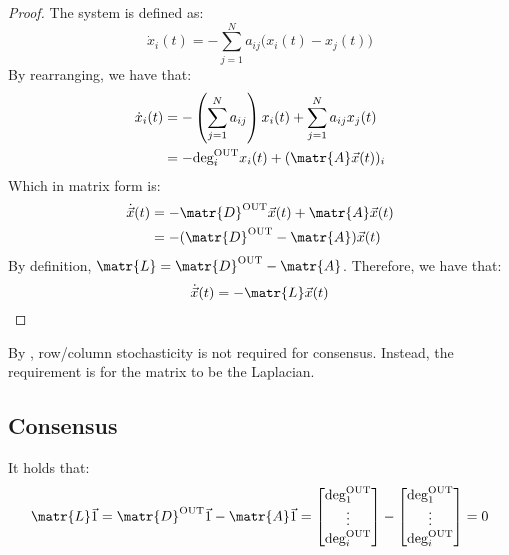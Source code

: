 \begin{description}
\begin{theorem}
            \begin{proof}
                The system is defined as:
                \[
                    \dot{x}_i(t) = - \sum_{j=1}^{N} a_{ij} \Big( x_i(t) - x_j(t) \Big)  
                \]
                By rearranging, we have that:
                \[
                    \begin{split}
                        \dot{x}_i(t) 
                            &= - \left( \sum_{j=1}^{N} a_{ij} \right) x_i(t) + \sum_{j=1}^{N} a_{ij} x_j(t) \\
                            &= -\outdeg[i] x_i(t) + (\matr{A}\vec{x}(t))_i
                    \end{split}
                \]
                Which in matrix form is:
                \[ 
                    \begin{split}
                        \dot{\vec{x}}(t) 
                            &= - \matr{D}^\text{OUT} \vec{x}(t) + \matr{A} \vec{x}(t) \\
                            &= - (\matr{D}^\text{OUT} - \matr{A}) \vec{x}(t) 
                    \end{split}
                \]
                By definition, $\matr{L} = \matr{D}^\text{OUT} - \matr{A}$. Therefore, we have that:
                \[ \dot{\vec{x}}(t) = - \matr{L} \vec{x}(t) \]  
            \end{proof}
        \end{theorem}

        \begin{remark}
            By , row/column stochasticity is not required for consensus. Instead, the requirement is for the matrix to be the Laplacian.
        \end{remark}
\end{description}


\subsection{Consensus}

\begin{lemma}
    It holds that:
    \[
        \matr{L}\vec{1} 
        = \matr{D}^\text{OUT} \vec{1} - \matr{A}\vec{1}
        = \begin{bmatrix} \outdeg[1] \\ \vdots \\ \outdeg[i] \end{bmatrix} - \begin{bmatrix} \outdeg[1] \\ \vdots \\ \outdeg[i] \end{bmatrix}
        = 0
    \]
\end{lemma}

